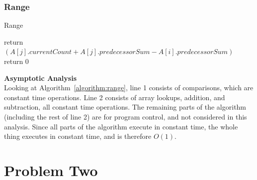 \documentclass[letterpaper, 10pt,DIV=13]{scrartcl}
\numberwithin{equation}{section} %
\numberwithin{figure}{section} %
\numberwithin{table}{section} %
\begin{document}
\subsubsection{Range}

\begin{algorithm}[H]
    \SetAlgoLined
    \caption{Range}
    \label{algorithm:range}
     
     {
        return $(A[j].currentCount + A[j].predecessorSum - A[i].predecessorSum)$\;
    } {
        return 0\;
   }
\end{algorithm}

\textbf{Asymptotic Analysis}\\
Looking at Algorithm~\ref{algorithm:range}, line 1 consists of comparisons, which are constant time operations.
Line 2 consists of array lookups, addition, and subtraction, all constant time operations.
The remaining parts of the algorithm (including the rest of line 2) are for program control, and not considered in this analysis. Since all parts of the algorithm execute in constant time, the whole thing executes in constant time, and is therefore $O(1)$.


\pagebreak

\section{Problem Two}


\pagebreak

\end{document}
